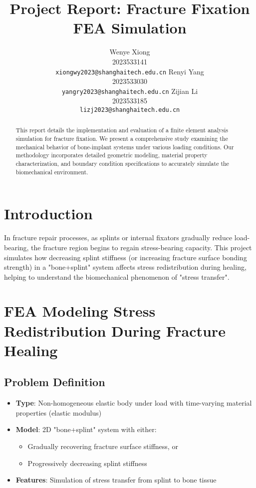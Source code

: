 \documentclass{article}
\title{Project Report: Fracture Fixation FEA Simulation}
\author{
  Wenye Xiong \\
  2023533141 \\
  \texttt{xiongwy2023@shanghaitech.edu.cn}
  \And
  Renyi Yang \\
  2023533030 \\
  \texttt{yangry2023@shanghaitech.edu.cn}
  \AND
  Zijian Li \\
  2023533185 \\
  \texttt{lizj2023@shanghaitech.edu.cn}
}
\begin{document}
\maketitle

\begin{abstract}
  This report details the implementation and evaluation of a finite element analysis simulation for fracture fixation. We present a comprehensive study examining the mechanical behavior of bone-implant systems under various loading conditions. Our methodology incorporates detailed geometric modeling, material property characterization, and boundary condition specifications to accurately simulate the biomechanical environment.
\end{abstract}



\section{Introduction}

In fracture repair processes, as splints or internal fixators gradually reduce load-bearing, the fracture region begins to regain stress-bearing capacity. This project simulates how decreasing splint stiffness (or increasing fracture surface bonding strength) in a "bone+splint" system affects stress redistribution during healing, helping to understand the biomechanical phenomenon of "stress transfer".

\section{FEA Modeling Stress Redistribution During Fracture Healing}

\subsection{Problem Definition}
\begin{itemize}
  \item \textbf{Type}: Non-homogeneous elastic body under load with time-varying material properties (elastic modulus)
  \item \textbf{Model}: 2D "bone+splint" system with either:
        \begin{itemize}
          \item Gradually recovering fracture surface stiffness, or
          \item Progressively decreasing splint stiffness
        \end{itemize}
  \item \textbf{Features}: Simulation of stress transfer from splint to bone tissue
\end{itemize}
\end{document}
